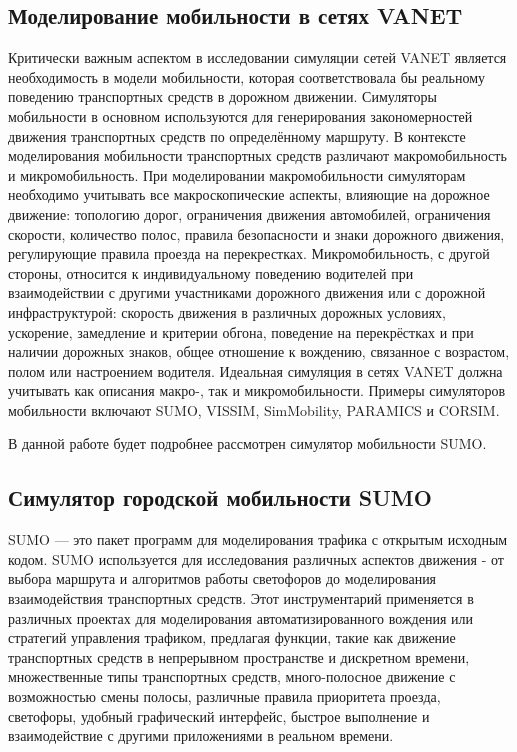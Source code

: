 \subsection*{Моделирование мобильности в сетях VANET}

Критически важным аспектом в исследовании симуляции сетей VANET является необходимость в модели мобильности, которая соответствовала бы реальному поведению транспортных средств в дорожном движении. Симуляторы мобильности в основном используются для генерирования закономерностей движения транспортных средств по определённому маршруту. В контексте моделирования мобильности транспортных средств различают макромобильность и микромобильность. При моделировании макромобильности симуляторам необходимо учитывать все макроскопические аспекты, влияющие на дорожное движение: топологию дорог, ограничения движения автомобилей, ограничения скорости, количество полос, правила безопасности и знаки дорожного движения, регулирующие правила проезда на перекрестках.
Микромобильность, с другой стороны, относится к индивидуальному поведению водителей при взаимодействии с другими участниками дорожного движения или с дорожной инфраструктурой: скорость движения в различных дорожных условиях, ускорение, замедление и критерии обгона, поведение на перекрёстках и при наличии дорожных знаков, общее отношение к вождению, связанное с возрастом, полом или настроением водителя. Идеальная симуляция в сетях VANET должна учитывать как описания макро-, так и микромобильности. Примеры симуляторов мобильности включают SUMO, VISSIM, SimMobility, PARAMICS и CORSIM.

В данной работе будет подробнее рассмотрен симулятор мобильности SUMO.

\subsection*{Симулятор городской мобильности SUMO}

SUMO — это пакет программ для моделирования трафика с открытым исходным кодом. SUMO используется для исследования различных аспектов движения - от выбора маршрута и алгоритмов работы светофоров до моделирования взаимодействия транспортных средств. Этот инструментарий применяется в различных проектах для моделирования автоматизированного вождения или стратегий управления трафиком, предлагая функции, такие как движение транспортных средств в непрерывном пространстве и дискретном времени, множественные типы транспортных средств, много-полосное движение с возможностью смены полосы, различные правила приоритета проезда, светофоры, удобный графический интерфейс, быстрое выполнение и взаимодействие с другими приложениями в реальном времени.

